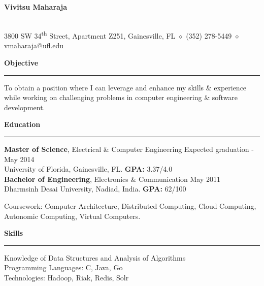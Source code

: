 \documentclass[10pt]{article}
\begin{document}
\begin{center}
\textbf{\Large Vivitsu Maharaja}
\date{}
\smallskip \\
3800 SW 34\textsuperscript{th} Street, Apartment Z251, Gainesville, FL $\diamond$ (352) 278-5449 $\diamond$ vmaharaja@ufl.edu
\end{center}

\textbf{Objective}
\smallskip
\hrule
To obtain a position where I can leverage and enhance my skills \& experience while working on challenging problems in computer engineering \& software development.

\textbf{Education}
\smallskip
\hrule
{\bf Master of Science}, Electrical \& Computer Engineering \hfill Expected graduation - May 2014\\
University of Florida, Gainesville, FL. {\bf GPA:} 3.37/4.0 \\
{\bf Bachelor of Engineering}, Electronics \& Communication \hfill May 2011\\
Dharmsinh Desai University, Nadiad, India. {\bf GPA:} 62/100

Coursework: Computer Architecture, Distributed Computing, Cloud Computing, Autonomic Computing, Virtual Computers.

\textbf{Skills}
\smallskip
\hrule
Knowledge of Data Structures and Analysis of Algorithms\\
Programming Languages: C, Java, Go\\
Technologies: Hadoop, Riak, Redis, Solr
\end{document}
